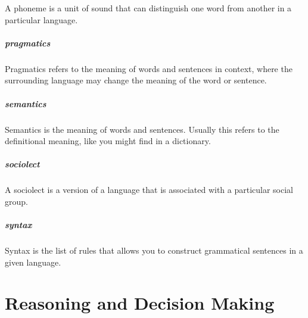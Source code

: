\documentclass[
]{krantz}
\begin{document}
A phoneme is a unit of sound that can distinguish one word from another in a particular language.

\hypertarget{pragmatics}{%
\paragraph*{pragmatics}\label{pragmatics}}

Pragmatics refers to the meaning of words and sentences in context, where the surrounding language may change the meaning of the word or sentence.

\hypertarget{semantics}{%
\paragraph*{semantics}\label{semantics}}

Semantics is the meaning of words and sentences. Usually this refers to the definitional meaning, like you might find in a dictionary.

\hypertarget{sociolect}{%
\paragraph*{sociolect}\label{sociolect}}

A sociolect is a version of a language that is associated with a particular social group.

\hypertarget{syntax}{%
\paragraph*{syntax}\label{syntax}}

Syntax is the list of rules that allows you to construct grammatical sentences in a given language.

\hypertarget{reasoning-and-decision-making}{%
\chapter{Reasoning and Decision Making}\label{reasoning-and-decision-making}}
\end{document}
